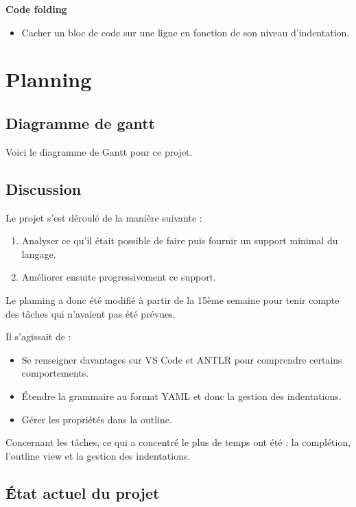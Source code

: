\documentclass[
    iict, %
    il, %
]{heig-tb}
\begin{document}
\textbf{Code folding}
\begin{itemize}
    \item Cacher un bloc de code sur une ligne en fonction de son niveau d'indentation.
\end{itemize}


\chapter{Planning}

\section{Diagramme de gantt}
Voici le diagramme de Gantt pour ce projet.



\section{Discussion}

Le projet s'est déroulé de la manière suivante :
\begin{enumerate}
    \item Analyser ce qu’il était possible de faire puis fournir un support minimal du langage.
    \item Améliorer ensuite progressivement ce support.
\end{enumerate}

Le planning a donc été modifié à partir de la 15ème semaine pour tenir compte des tâches qui n'avaient pas été prévues.

Il s'agissait de :

\begin{itemize}
    \item Se renseigner davantages sur VS Code et ANTLR pour comprendre certains comportements.
    \item Étendre la grammaire au format YAML et donc la gestion des indentations.
    \item Gérer les propriétés dans la outline.
\end{itemize}

Concernant les tâches, ce qui a concentré le plus de temps ont été : la complétion, l'outline view et la gestion des indentations.

\section{État actuel du projet}
\end{document}
